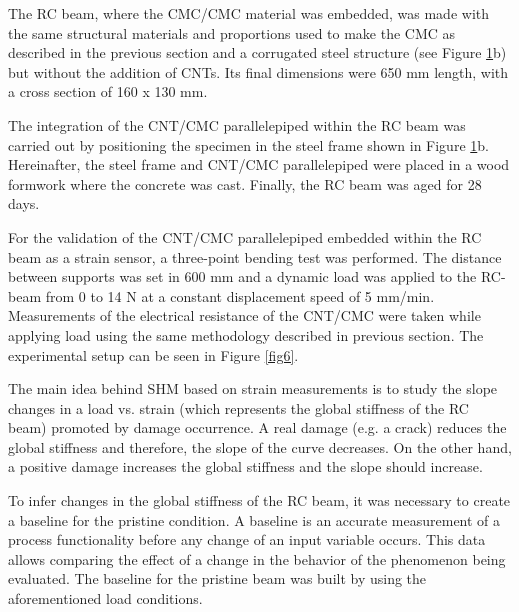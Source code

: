\documentclass[twocolumn]{bmcart}%
\begin{document}
The RC beam, where the CMC/CMC material was embedded, was made with the same structural materials and proportions used to make the CMC as described in the previous section and a corrugated steel structure (see Figure \ref{fig5}b) but without the addition of CNTs. Its final dimensions were 650 mm length, with a cross section of 160 x 130 mm.

The integration of the CNT/CMC parallelepiped within the RC beam was carried out by positioning the specimen in the steel frame shown in Figure \ref{fig5}b. Hereinafter, the steel frame and CNT/CMC parallelepiped were placed in a wood formwork where the concrete was cast. Finally, the RC beam was aged for 28 days. 

\begin{figure}[h!]
  \caption{
      }
      \label{fig5}
      \end{figure}


For the validation of the CNT/CMC parallelepiped embedded within the RC beam as a strain sensor, a three-point bending test was performed. The distance between supports was set in 600 mm and a dynamic load was applied to the RC-beam from 0 to 14 N at a constant displacement speed of 5 mm/min. Measurements of the electrical resistance of the CNT/CMC were taken while applying load using the same methodology described in previous section. The experimental setup can be seen in Figure \ref{fig6}.

The main idea behind SHM based on strain measurements is to study the slope changes in a load vs. strain (which represents the global stiffness of the RC beam) promoted by damage occurrence. A real damage (e.g. a crack) reduces the global stiffness and therefore, the slope of the curve decreases. On the other hand, a positive damage increases the global stiffness and the slope should increase.

To infer changes in the global stiffness of the RC beam, it was necessary to create a baseline for the pristine condition. A baseline is an accurate measurement of a process functionality before any change of an input variable occurs. This data allows comparing the effect of a change in the behavior of the phenomenon being evaluated.  The baseline for the pristine beam was built by using the aforementioned load conditions.
\end{document}
